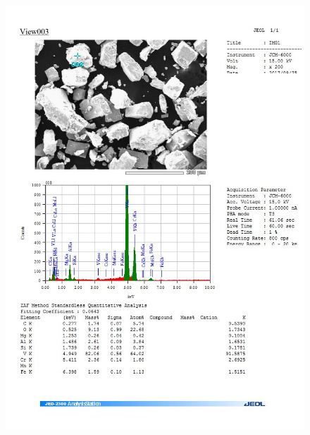 \documentclass[12pt]{article}
\begin{document}
\begin{figure}[H]
	\includegraphics[width = \linewidth]{./pictures/dot_spec_8.jpg}
\end{figure}
\end{document}
